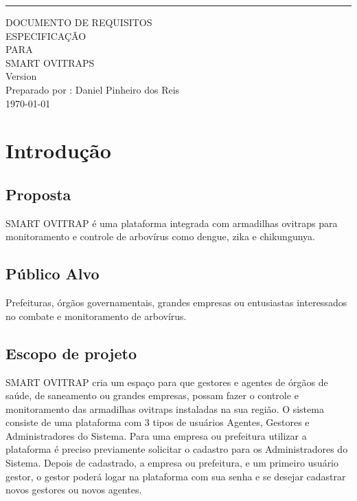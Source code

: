 	\begin{flushright}
		\rule{10cm}{5pt}\vskip1cm
		\begin{bfseries}
			\Huge{DOCUMENTO DE REQUISITOS\\ESPECIFICAÇÃO}\\
			\vspace{1.5cm}
			PARA\\
			\vspace{1.5cm}
			SMART OVITRAPS\\
			\vspace{1.5cm}
			\LARGE{Version \myversion}\\
			\vspace{1.5cm}
			Preparado por : Daniel Pinheiro dos Reis\\
			\vspace{1.5cm}
			\today\\
		\end{bfseries}
	\end{flushright}
		
	\chapter*{Introdução}
	
	\section*{Proposta}
	SMART OVITRAP é uma plataforma integrada com armadilhas ovitraps para monitoramento e controle de arbovírus como dengue, zika e chikungunya. 
	
	\section*{Público Alvo}
	Prefeituras, órgãos governamentais, grandes empresas ou entusiastas interessados no combate e monitoramento de arbovírus.
	\section*{Escopo de projeto}
	SMART OVITRAP cria um espaço para que gestores e agentes de órgãos de saúde, de saneamento ou grandes empresas, possam fazer o controle e 
	monitoramento das armadilhas ovitraps instaladas na sua região.
	\newline
	O sistema consiste de uma plataforma com 3 tipos de usuários Agentes, Gestores e Administradores do Sistema.
	Para uma empresa ou prefeitura utilizar a plataforma é preciso previamente solicitar o cadastro para os Administradores do Sistema. Depois de cadastrado,
	a empresa ou prefeitura, e um primeiro usuário gestor, o gestor poderá logar na plataforma com sua senha e se desejar cadastrar 
	novos gestores ou novos agentes. 
	
